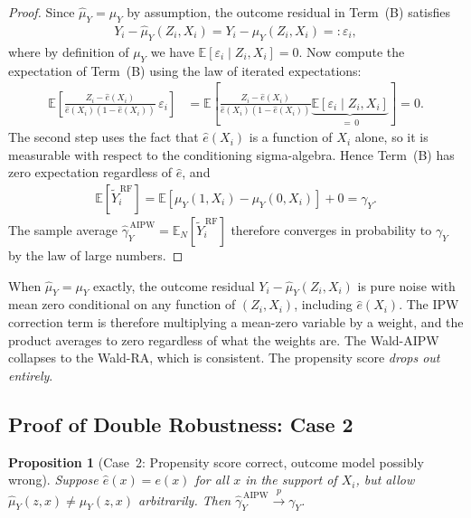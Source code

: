 \documentclass[12pt,a4paper]{article}
\newtheorem{proposition}{Proposition}
\theoremstyle{remark}
\newcommand{\E}{\mathbb{E}}
\newcommand{\En}{\mathbb{E}_N}
\newcommand{\muY}{\mu_Y}
\newcommand{\muYhat}{\hat{\mu}_Y}
\newcommand{\ehat}{\hat{e}}
\newcommand{\YRF}{\widetilde{Y}^{\,\mathrm{RF}}}
\newenvironment{intuition}[1]{%
  \begin{tcolorbox}[
    enhanced,
    colback=remarkbg,
    colframe=remarkframe,
    arc=3pt,
    boxrule=0.6pt,
    left=8pt, right=8pt, top=6pt, bottom=6pt,
    title={\small\textit{Intuition: #1}},
    fonttitle=\bfseries\small,
    coltitle=black
  ]
  \small
}{%
  \end{tcolorbox}
}
\begin{document}
\begin{proof}
Since $\muYhat = \muY$ by assumption, the outcome residual in Term~(B) satisfies
\begin{align}
  Y_i - \muYhat(Z_i, X_i)
  = Y_i - \muY(Z_i, X_i)
  =: \varepsilon_i,
  \label{eq:case1_residual}
\end{align}
where by definition of $\muY$ we have $\E[\varepsilon_i \mid Z_i, X_i] = 0$. Now
compute the expectation of Term~(B) using the law of iterated expectations:
\begin{align}
  \E\!\left[
    \frac{Z_i - \ehat(X_i)}{\ehat(X_i)(1-\ehat(X_i))}\,\varepsilon_i
  \right]
  &= \E\!\left[
      \frac{Z_i - \ehat(X_i)}{\ehat(X_i)(1-\ehat(X_i))}
      \underbrace{\E[\varepsilon_i \mid Z_i, X_i]}_{=\,0}
    \right]
  = 0.
  \label{eq:case1_zero}
\end{align}
The second step uses the fact that $\ehat(X_i)$ is a function of $X_i$ alone, so it
is measurable with respect to the conditioning sigma-algebra. Hence Term~(B) has
zero expectation regardless of $\ehat$, and
\begin{align}
  \E[\YRF_i]
  = \E[\muY(1,X_i) - \muY(0,X_i)] + 0
  = \gamma_Y.
  \label{eq:case1_result}
\end{align}
The sample average $\hat{\gamma}_Y^{\,\mathrm{AIPW}} = \En[\YRF_i]$ therefore
converges in probability to $\gamma_Y$ by the law of large numbers.
\end{proof}

\begin{intuition}{What happens when the outcome model is perfect}
When $\muYhat = \muY$ exactly, the outcome residual $Y_i - \muYhat(Z_i,X_i)$ is
pure noise with mean zero conditional on any function of $(Z_i,X_i)$, including
$\ehat(X_i)$. The IPW correction term is therefore multiplying a mean-zero variable
by a weight, and the product averages to zero regardless of what the weights are.
The Wald-AIPW collapses to the Wald-RA, which is consistent. The propensity score
\emph{drops out entirely}.
\end{intuition}

\subsection{Proof of Double Robustness: Case 2}
\label{subsec:dr_case2}

\begin{proposition}[Case~2: Propensity score correct, outcome model possibly wrong]
\label{prop:dr_case2}
Suppose $\ehat(x) = e(x)$ for all $x$ in the support of $X_i$, but allow
$\muYhat(z,x) \neq \muY(z,x)$ arbitrarily. Then
$\hat{\gamma}_Y^{\,\mathrm{AIPW}} \xrightarrow{p} \gamma_Y$.
\end{proposition}
\end{document}
